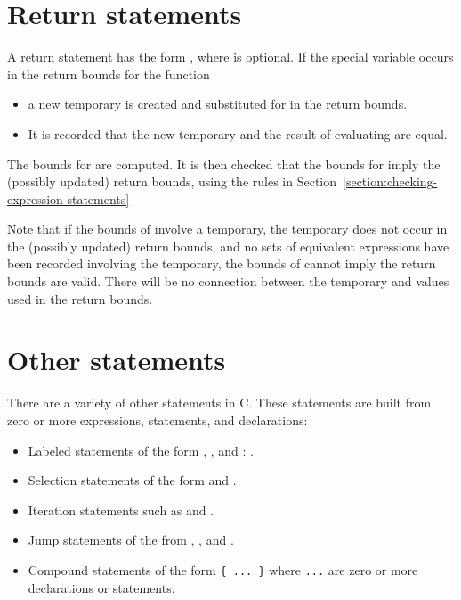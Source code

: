  \section{Return statements}
 \label{section:checking-return-statements}

A return statement has the form  , where 
is optional. If the special
variable  occurs in the return bounds
for the function
\begin{itemize}
\item a new temporary is created and substituted for
 in the return bounds.
\item  It is recorded that the new temporary and the result
of evaluating  are equal.
\end{itemize}
The bounds for  are computed.   It is then checked that
the bounds for  imply the (possibly updated) return
bounds, using  the rules in 
Section~\ref{section:checking-expression-statements}

Note that if the bounds of  involve a temporary,
the temporary does not occur in the (possibly updated) return bounds,
and no sets of equivalent expressions have been recorded involving the temporary,
the bounds of  cannot imply the return bounds are
valid.  There will be no connection between the temporary
and values used in the return bounds.

\section{Other statements}

There are a variety of other statements in C. These statements are built
from zero or more expressions, statements, and declarations:

\begin{itemize}
\item
  Labeled statements of the form 
   \code{:} ,
   , and  :
  .
\item
  Selection statements of the form \code{)} 
   
   and \code{)}
  .
\item
  Iteration statements such as \code{)}
   and 
  \code{;}  \code{;} 
   \code{)} .
\item
  Jump statements of the from  ,
  , and .
\item
  Compound statements of the form \lstinline|{ ... }| where \lstinline|...|
  are zero or more declarations or statements.
\end{itemize}

